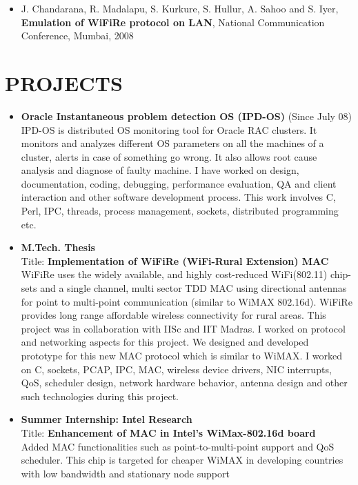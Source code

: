 \documentclass{res}
\begin{document}
\begin{resume}
\begin{itemize}
					  \item J. Chandarana, R. Madalapu, S. Kurkure, S. Hullur, A. Sahoo and S. Iyer, {\bf Emulation of WiFiRe
					  protocol on LAN}, National Communication Conference, Mumbai, 2008

					  \end{itemize}


					  \vspace{0.2in} 

					  \section{PROJECTS}
					  \begin{itemize}
					  \item {\bf Oracle Instantaneous problem detection OS (IPD-OS)} (Since July 08)\\
						  IPD-OS is distributed OS monitoring tool for Oracle RAC clusters. It monitors and analyzes different
						  OS parameters on all the machines of a cluster, alerts in case of something go wrong. It also allows
						  root cause analysis and diagnose of faulty machine. I have worked on design, documentation, coding,
						  debugging, performance evaluation, QA and client interaction and other software development process.
						  This work involves C, Perl, IPC, threads, process management, sockets, distributed programming etc.

					  \item {\bf M.Tech. Thesis} \\
					  Title: {\bf Implementation of WiFiRe (WiFi-Rural Extension) MAC}\\
					  WiFiRe uses the widely available, and highly cost-reduced WiFi(802.11) chip-sets and a single channel, multi sector TDD MAC using directional antennas for point to multi-point communication (similar to WiMAX 802.16d). WiFiRe provides long range affordable wireless connectivity for rural areas. This project was in collaboration with IISc and IIT Madras. I worked on protocol and networking aspects for this project. We designed and developed prototype for this new MAC protocol which is similar to WiMAX. I worked on C, sockets, PCAP, IPC, MAC, wireless device drivers, NIC interrupts, QoS, scheduler design, network hardware behavior, antenna design and other such technologies during this project.

	
					  \item {\bf Summer Internship: Intel Research}\\
					  Title: {\bf Enhancement of MAC in Intel’s WiMax-802.16d board}\\
					  Added MAC functionalities such as point-to-multi-point support and QoS scheduler. This chip is targeted for cheaper WiMAX in developing countries with low bandwidth and stationary node support


\end{itemize}
\end{resume}
\end{document}
